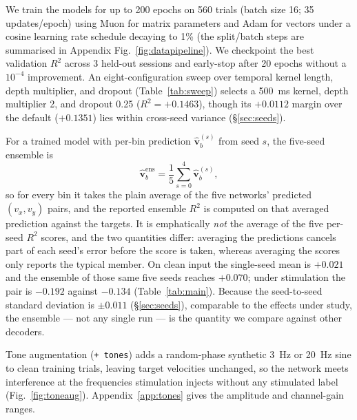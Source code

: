 \documentclass{article}
\begin{document}
We train the models for up to 200 epochs on 560 trials (batch size 16; 35 updates/epoch) using Muon for matrix parameters and Adam for vectors under a cosine learning rate schedule decaying to 1\% (the split/batch steps are summarised in Appendix Fig.~\ref{fig:datapipeline}). We checkpoint the best validation $R^2$ across 3 held-out sessions and early-stop after 20 epochs without a $10^{-4}$ improvement. An eight-configuration sweep over temporal kernel length, depth multiplier, and dropout (Table~\ref{tab:sweep}) selects a 500~ms kernel, depth multiplier 2, and dropout 0.25 ($R^2 = +0.1463$), though its $+0.0112$ margin over the default ($+0.1351$) lies within cross-seed variance (\S\ref{sec:seeds}).

For a trained model with per-bin prediction $\hat{\mathbf{v}}^{(s)}_b$ from seed $s$, the five-seed ensemble is
\begin{equation}
\hat{\mathbf{v}}^{\mathrm{ens}}_b = \frac{1}{5}\sum_{s=0}^{4}\hat{\mathbf{v}}^{(s)}_b,
\label{eq:ensemble}
\end{equation}
so for every bin it takes the plain average of the five networks' predicted $(v_x,v_y)$ pairs, and the reported ensemble $R^2$ is computed on that averaged prediction against the targets. It is emphatically \emph{not} the average of the five per-seed $R^2$ scores, and the two quantities differ: averaging the predictions cancels part of each seed's error before the score is taken, whereas averaging the scores only reports the typical member. On clean input the single-seed mean is $+0.021$ and the ensemble of those same five seeds reaches $+0.070$; under stimulation the pair is $-0.192$ against $-0.134$ (Table~\ref{tab:main}). Because the seed-to-seed standard deviation is $\pm 0.011$ (\S\ref{sec:seeds}), comparable to the effects under study, the ensemble --- not any single run --- is the quantity we compare against other decoders.

Tone augmentation (\texttt{+ tones}) adds a random-phase synthetic 3~Hz or 20~Hz sine to clean training trials, leaving target velocities unchanged, so the network meets interference at the frequencies stimulation injects without any stimulated label (Fig.~\ref{fig:toneaug}). Appendix~\ref{app:tones} gives the amplitude and channel-gain ranges.
\end{document}

